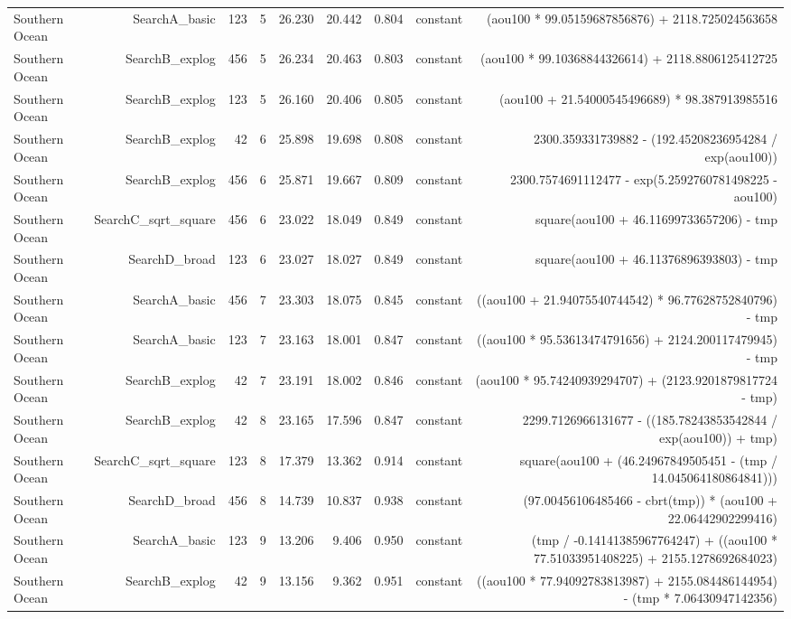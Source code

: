 \begin{table}
{\begin{tabular}{lrrrrrrrr}
Southern Ocean & SearchA\_basic & 123 & 5 & 26.230 & 20.442 & 0.804 & constant & (aou100 * 99.05159687856876) + 2118.725024563658 \\
Southern Ocean & SearchB\_explog & 456 & 5 & 26.234 & 20.463 & 0.803 & constant & (aou100 * 99.10368844326614) + 2118.8806125412725 \\
Southern Ocean & SearchB\_explog & 123 & 5 & 26.160 & 20.406 & 0.805 & constant & (aou100 + 21.54000545496689) * 98.387913985516 \\
Southern Ocean & SearchB\_explog & 42 & 6 & 25.898 & 19.698 & 0.808 & constant & 2300.359331739882 - (192.45208236954284 / exp(aou100)) \\
Southern Ocean & SearchB\_explog & 456 & 6 & 25.871 & 19.667 & 0.809 & constant & 2300.7574691112477 - exp(5.2592760781498225 - aou100) \\
Southern Ocean & SearchC\_sqrt\_square & 456 & 6 & 23.022 & 18.049 & 0.849 & constant & square(aou100 + 46.11699733657206) - tmp \\
Southern Ocean & SearchD\_broad & 123 & 6 & 23.027 & 18.027 & 0.849 & constant & square(aou100 + 46.11376896393803) - tmp \\
Southern Ocean & SearchA\_basic & 456 & 7 & 23.303 & 18.075 & 0.845 & constant & ((aou100 + 21.94075540744542) * 96.77628752840796) - tmp \\
Southern Ocean & SearchA\_basic & 123 & 7 & 23.163 & 18.001 & 0.847 & constant & ((aou100 * 95.53613474791656) + 2124.200117479945) - tmp \\
Southern Ocean & SearchB\_explog & 42 & 7 & 23.191 & 18.002 & 0.846 & constant & (aou100 * 95.74240939294707) + (2123.9201879817724 - tmp) \\
Southern Ocean & SearchB\_explog & 42 & 8 & 23.165 & 17.596 & 0.847 & constant & 2299.7126966131677 - ((185.78243853542844 / exp(aou100)) + tmp) \\
Southern Ocean & SearchC\_sqrt\_square & 123 & 8 & 17.379 & 13.362 & 0.914 & constant & square(aou100 + (46.24967849505451 - (tmp / 14.045064180864841))) \\
Southern Ocean & SearchD\_broad & 456 & 8 & 14.739 & 10.837 & 0.938 & constant & (97.00456106485466 - cbrt(tmp)) * (aou100 + 22.06442902299416) \\
Southern Ocean & SearchA\_basic & 123 & 9 & 13.206 & 9.406 & 0.950 & constant & (tmp / -0.14141385967764247) + ((aou100 * 77.51033951408225) + 2155.1278692684023) \\
Southern Ocean & SearchB\_explog & 42 & 9 & 13.156 & 9.362 & 0.951 & constant & ((aou100 * 77.94092783813987) + 2155.084486144954) - (tmp * 7.06430947142356) \\

\end{tabular}}
\end{table}
